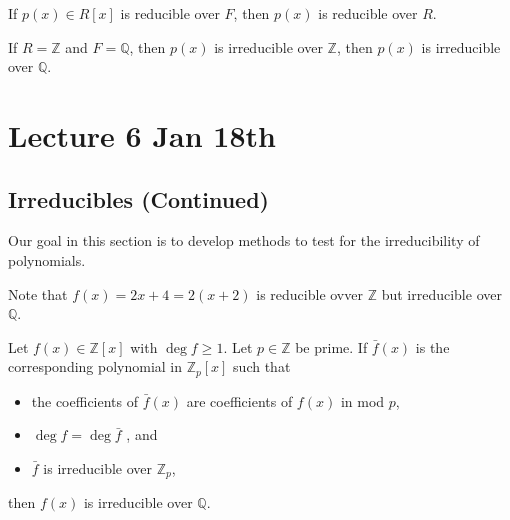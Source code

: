 \documentclass[notoc,notitlepage]{tufte-book}
\begin{document}
\begin{note}
  If $p(x) \in R[x]$ is reducible over $F$, then $p(x)$ is reducible over $R$.
\end{note}

\begin{note}
  If $R = \mathbb{Z}$ and $F = \mathbb{Q}$, then $p(x)$ is irreducible over
  $\mathbb{Z}$, then $p(x)$ is irreducible over $\mathbb{Q}$.
\end{note}



\chapter{Lecture 6 Jan 18th}%
\label{chp:lecture_6_jan_18th}

\section{Irreducibles (Continued)}%
\label{sec:irreducibles_continued}

Our goal in this section is to develop methods to test for the irreducibility
of polynomials.

\begin{warning}
  Note that $f(x) = 2x + 4 = 2(x + 2)$ is reducible ovver $\mathbb{Z}$
   but
  irreducible over $\mathbb{Q}$.
\end{warning}

\begin{propo}\label{propo:mod_p_irreducibility_test}
  Let $f(x) \in \mathbb{Z}[x]$ with $\deg f \geq 1$. Let $p \in \mathbb{Z}$ be prime.
  If $\bar{f}(x)$ is the corresponding polynomial in $\mathbb{Z}_p[x]$ such that
  \begin{itemize}
    \item the coefficients of $\bar{f}(x)$ are coefficients of $f(x)$ in mod $p$,
    \item $\deg f = \deg \bar{f}$ , and
    \item $\bar{f}$ is irreducible over $\mathbb{Z}_p$,
  \end{itemize}
  then $f(x)$ is irreducible over $\mathbb{Q}$.
\end{propo}
\end{document}
